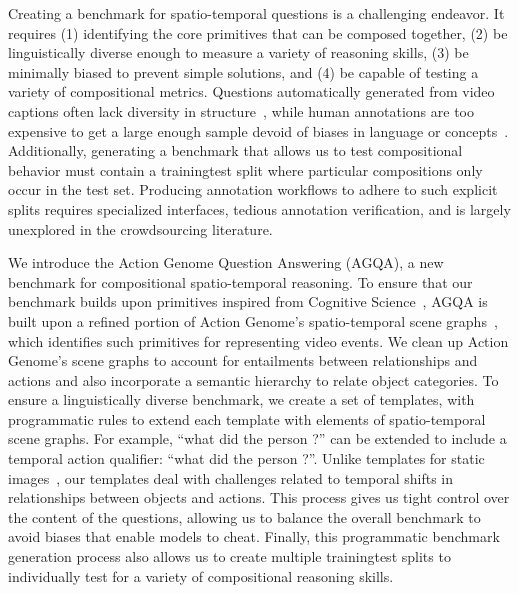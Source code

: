 Creating a benchmark for spatio-temporal questions is a challenging endeavor. It requires (1) identifying the core primitives that can be composed together, (2) be linguistically diverse enough to measure a variety of reasoning skills, (3) be minimally biased to prevent simple solutions, and (4) be capable of testing a variety of compositional metrics. 
Questions automatically generated from video captions often lack diversity in structure~\cite{yu2019activitynet,jang2017tgif}, while human annotations are too expensive to get a large enough sample devoid of biases in language or concepts~\cite{zeng2016leveraging,yu2019activitynet}. Additionally, generating a benchmark that allows us to test compositional behavior must contain a training\/test split where particular compositions only occur in the test set. Producing annotation workflows to adhere to such explicit splits requires specialized interfaces, tedious annotation verification, and is largely unexplored in the crowdsourcing literature.


We introduce the Action Genome Question Answering (AGQA), a new benchmark for compositional spatio-temporal reasoning. To ensure that our benchmark builds upon primitives inspired from Cognitive Science~\cite{kurby2008segmentation,zacks2001events}, AGQA is built upon a refined portion of Action Genome's spatio-temporal scene graphs~\cite{ji2020action}, which identifies such primitives for representing video events. 
We clean up Action Genome's scene graphs to account for entailments between relationships and actions and also incorporate a semantic hierarchy to relate object categories. 
To ensure a linguistically diverse benchmark, we create a set of templates, with programmatic rules to extend each template with elements of spatio-temporal scene graphs. For example, ``what did the person ?'' can be extended to include a temporal action qualifier: ``what did the person   ?''. Unlike templates for static images~\cite{hudson2019gqa}, our templates deal with challenges related to temporal shifts in relationships between objects and actions. 
This process gives us tight control over the content of the questions, allowing us to balance the overall benchmark to avoid biases that enable models to cheat. 
Finally, this programmatic benchmark generation process also allows us to create multiple training\/test splits to individually test for a variety of compositional reasoning skills.


